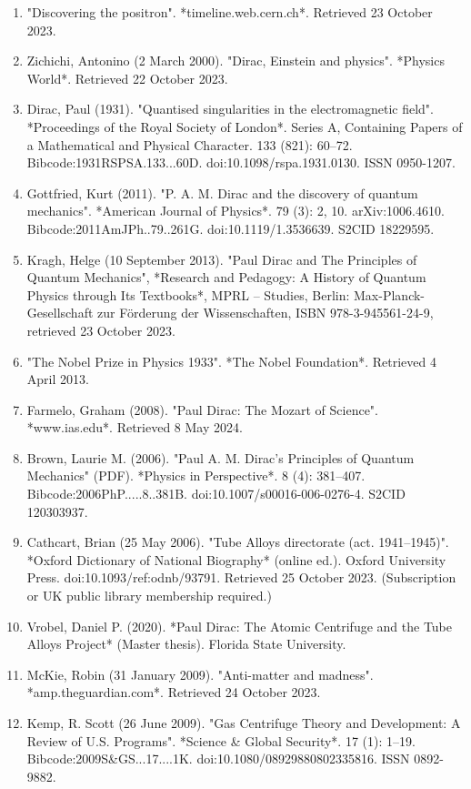 \begin{enumerate}
\item "Discovering the positron". *timeline.web.cern.ch*. Retrieved 23 October 2023.
\item Zichichi, Antonino (2 March 2000). "Dirac, Einstein and physics". *Physics World*. Retrieved 22 October 2023.
\item Dirac, Paul (1931). "Quantised singularities in the electromagnetic field". *Proceedings of the Royal Society of London*. Series A, Containing Papers of a Mathematical and Physical Character. 133 (821): 60–72. Bibcode:1931RSPSA.133...60D. doi:10.1098/rspa.1931.0130. ISSN 0950-1207.
\item Gottfried, Kurt (2011). "P. A. M. Dirac and the discovery of quantum mechanics". *American Journal of Physics*. 79 (3): 2, 10. arXiv:1006.4610. Bibcode:2011AmJPh..79..261G. doi:10.1119/1.3536639. S2CID 18229595.
\item Kragh, Helge (10 September 2013). "Paul Dirac and The Principles of Quantum Mechanics", *Research and Pedagogy: A History of Quantum Physics through Its Textbooks*, MPRL – Studies, Berlin: Max-Planck-Gesellschaft zur Förderung der Wissenschaften, ISBN 978-3-945561-24-9, retrieved 23 October 2023.
\item "The Nobel Prize in Physics 1933". *The Nobel Foundation*. Retrieved 4 April 2013.
\item Farmelo, Graham (2008). "Paul Dirac: The Mozart of Science". *www.ias.edu*. Retrieved 8 May 2024.
\item Brown, Laurie M. (2006). "Paul A. M. Dirac's Principles of Quantum Mechanics" (PDF). *Physics in Perspective*. 8 (4): 381–407. Bibcode:2006PhP.....8..381B. doi:10.1007/s00016-006-0276-4. S2CID 120303937.
\item Cathcart, Brian (25 May 2006). "Tube Alloys directorate (act. 1941–1945)". *Oxford Dictionary of National Biography* (online ed.). Oxford University Press. doi:10.1093/ref:odnb/93791. Retrieved 25 October 2023. (Subscription or UK public library membership required.)
\item Vrobel, Daniel P. (2020). *Paul Dirac: The Atomic Centrifuge and the Tube Alloys Project* (Master thesis). Florida State University.
\item McKie, Robin (31 January 2009). "Anti-matter and madness". *amp.theguardian.com*. Retrieved 24 October 2023.
\item Kemp, R. Scott (26 June 2009). "Gas Centrifuge Theory and Development: A Review of U.S. Programs". *Science & Global Security*. 17 (1): 1–19. Bibcode:2009S&GS...17....1K. doi:10.1080/08929880802335816. ISSN 0892-9882.

\end{enumerate}
